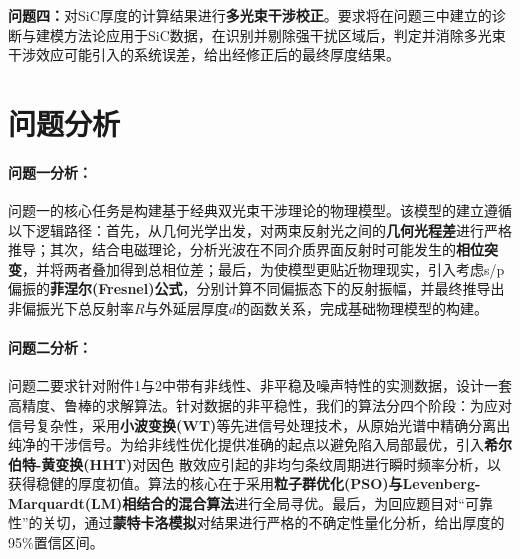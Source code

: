 \documentclass[withoutpreface,bwprint]{cumcmthesis} %
\begin{document}
\vspace{0.5em}
\noindent
\textbf{问题四：}对SiC厚度的计算结果进行\textbf{多光束干涉校正}。要求将在问题三中建立的诊断与建模方法论应用于SiC数据，在识别并剔除强干扰区域后，判定并消除多光束干涉效应可能引入的系统误差，给出经修正后的最终厚度结果。




\section{问题分析}

\paragraph{问题一分析：}
问题一的核心任务是构建基于经典双光束干涉理论的物理模型。该模型的建立遵循以下逻辑路径：首先，从几何光学出发，对两束反射光之间的\textbf{几何光程差}进行严格推导；其次，结合电磁理论，分析光波在不同介质界面反射时可能发生的\textbf{相位突变}，并将两者叠加得到总相位差；最后，为使模型更贴近物理现实，引入考虑s/p偏振的\textbf{菲涅尔(Fresnel)公式}，分别计算不同偏振态下的反射振幅，并最终推导出非偏振光下总反射率$R$与外延层厚度$d$的函数关系，完成基础物理模型的构建。

\paragraph{问题二分析：}
问题二要求针对附件1与2中带有非线性、非平稳及噪声特性的实测数据，设计一套高精度、鲁棒的求解算法。针对数据的非平稳性，我们的算法分四个阶段：为应对信号复杂性，采用\textbf{小波变换(WT)}等先进信号处理技术，从原始光谱中精确分离出纯净的干涉信号。为给非线性优化提供准确的起点以避免陷入局部最优，引入\textbf{希尔伯特-黄变换(HHT)}对因色
散效应引起的非均匀条纹周期进行瞬时频率分析，以获得稳健的厚度初值。算法的核心在于采用\textbf{粒子群优化(PSO)\cite{粒子群优化}与Levenberg-Marquardt(LM)\cite{LM算法}相结合的混合算法}进行全局寻优。最后，为回应题目对“可靠性”的关切，通过\textbf{蒙特卡洛模拟}对结果进行严格的不确定性量化分析，给出厚度的95\%置信区间。
\end{document}
